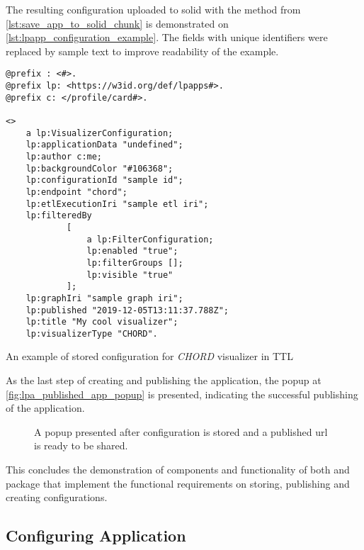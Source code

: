 The resulting \lpa{} configuration uploaded to solid with the method from \autoref{lst:save_app_to_solid_chunk} is demonstrated on \autoref{lst:lpapp_configuration_example}. The fields with unique identifiers were replaced by sample text to improve readability of the example. 

\begin{listing}[H]    
\begin{verbatim}
@prefix : <#>.
@prefix lp: <https://w3id.org/def/lpapps#>.
@prefix c: </profile/card#>.

<>
    a lp:VisualizerConfiguration;
    lp:applicationData "undefined";
    lp:author c:me;
    lp:backgroundColor "#106368";
    lp:configurationId "sample id";
    lp:endpoint "chord";
    lp:etlExecutionIri "sample etl iri";
    lp:filteredBy
            [
                a lp:FilterConfiguration;
                lp:enabled "true";
                lp:filterGroups [];
                lp:visible "true"
            ];
    lp:graphIri "sample graph iri";
    lp:published "2019-12-05T13:11:37.788Z";
    lp:title "My cool visualizer";
    lp:visualizerType "CHORD".
\end{verbatim}
\caption{An example of stored \lpa{} configuration for \textit{CHORD} visualizer in TTL} 
\label{lst:lpapp_configuration_example}
\end{listing}

As the last step of creating and publishing the \lpa{} application, the popup at \autoref{fig:lpa_published_app_popup} is presented, indicating the successful publishing of the application. 

\begin{figure}[h]
\centering
{}
\caption{A popup presented after configuration is stored and a published url is ready to be shared.}
\label{fig:lpa_published_app_popup}
\end{figure}

This concludes the demonstration of components and functionality of both \lpa{} and \lpas{} package that implement the functional requirements on storing, publishing and creating \lpa{} configurations. 

\subsection{Configuring Application}
\label{ssssec:configuring_application_implementation}

